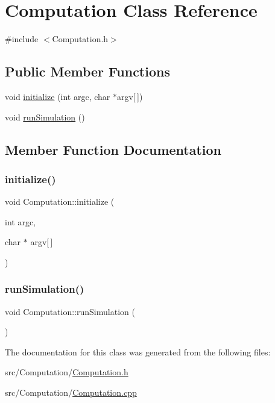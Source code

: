 \hypertarget{classComputation}{}\section{Computation Class Reference}
\label{classComputation}


{\ttfamily \#include $<$Computation.\+h$>$}

\subsection*{Public Member Functions}
\begin{DoxyCompactItemize}
\item 
void \mbox{\hyperlink{classComputation_a4a344479797b15bd5c9ed2f262657339}{initialize}} (int argc, char $\ast$argv\mbox{[}$\,$\mbox{]})
\item 
void \mbox{\hyperlink{classComputation_ad20ce6e82ec9a918e6ac03840bc688d5}{run\+Simulation}} ()
\end{DoxyCompactItemize}


\subsection{Member Function Documentation}
\mbox{\label{classComputation_a4a344479797b15bd5c9ed2f262657339}} 
\subsubsection{\texorpdfstring{initialize()}{initialize()}}
{\footnotesize\ttfamily void Computation\+::initialize (\begin{DoxyParamCaption}\item[{int}]{argc,  }\item[{char $\ast$}]{argv\mbox{[}$\,$\mbox{]} }\end{DoxyParamCaption})}

\mbox{\label{classComputation_ad20ce6e82ec9a918e6ac03840bc688d5}} 
\subsubsection{\texorpdfstring{runSimulation()}{runSimulation()}}
{\footnotesize\ttfamily void Computation\+::run\+Simulation (\begin{DoxyParamCaption}{ }\end{DoxyParamCaption})}



The documentation for this class was generated from the following files\+:\begin{DoxyCompactItemize}
\item 
src/\+Computation/\mbox{\hyperlink{Computation_8h}{Computation.\+h}}\item 
src/\+Computation/\mbox{\hyperlink{Computation_8cpp}{Computation.\+cpp}}\end{DoxyCompactItemize}
